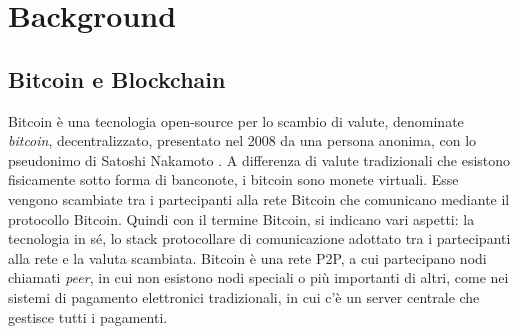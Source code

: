 \chapter{Background}

\section{Bitcoin e Blockchain}
Bitcoin è una tecnologia open-source per lo scambio di valute, denominate \emph{bitcoin}, decentralizzato, presentato nel 2008 da una persona anonima, con lo pseudonimo di Satoshi Nakamoto \cite{nakamoto2019bitcoin}.
A differenza di valute tradizionali che esistono fisicamente sotto forma di banconote, i bitcoin sono monete virtuali. Esse vengono scambiate tra i partecipanti alla rete Bitcoin che comunicano mediante il protocollo Bitcoin. Quindi con il termine Bitcoin, si indicano vari aspetti: la tecnologia in sé, lo stack protocollare di comunicazione adottato tra i partecipanti alla rete e la valuta scambiata.
Bitcoin è una rete P2P, a cui partecipano nodi chiamati \emph{peer}, in cui non esistono nodi speciali o più importanti di altri, come nei sistemi di pagamento elettronici tradizionali, in cui c'è un server centrale che gestisce tutti i pagamenti.


